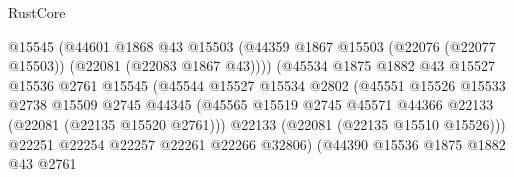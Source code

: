 \begin{lexlean}{RustCore}
\begin{coremodule}
                                        @15545
                                        (@44601
                                          @1868
                                          @43
                                          @15503
                                          (@44359
                                            @1867
                                            @15503
                                            (@22076 (@22077 @15503))
                                            (@22081 (@22083 @1867 @43))))
                                        (@45534
                                          @1875
                                          @1882
                                          @43
                                          @15527
                                          @15536
                                          @2761
                                          @15545
                                          (@45544
                                            @15527
                                            @15534
                                            @2802
                                            (@45551
                                              @15526
                                              @15533
                                              @2738
                                              @15509
                                              @2745
                                              @44345
                                              (@45565
                                                @15519
                                                @2745
                                                @45571
                                                @44366
                                                @22133
                                                (@22081 (@22135 @15520 @2761)))
                                              @22133
                                              (@22081 (@22135 @15510 @15526)))
                                            @22251
                                            @22254
                                            @22257
                                            @22261
                                            @22266
                                            @32806)
                                          (@44390
                                            @15536
                                            @1875
                                            @1882
                                            @43
                                            @2761

\end{coremodule}
\end{lexlean}

